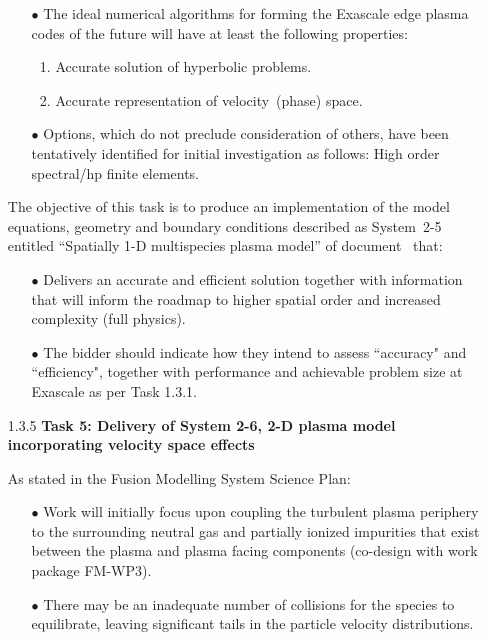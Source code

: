 \begin{itemize}
\begin{itemize}
\item[$\bullet$] The ideal numerical algorithms for forming the Exascale edge plasma codes 
of the future will have at least the following properties: 

\begin{enumerate}
\item Accurate solution of hyperbolic problems. 
\item Accurate representation of velocity~(phase) space. 
\end{enumerate}

\item[$\bullet$] Options, which do not preclude consideration of others, have been tentatively 
identified for initial investigation as follows: High order spectral/hp finite 
elements.
\end{itemize}

The objective of this task is to produce an implementation of the model equations, 
geometry and boundary conditions described as System~2-5 entitled ``Spatially 
1-D multispecies plasma model'' of document~\cite{pappeqs} that: 

\begin{itemize}
\item[$\bullet$] Delivers an accurate and efficient solution together with information that 
will inform the roadmap to higher spatial order and increased complexity (full physics).
\item[$\bullet$] The bidder should indicate how they intend to assess ``accuracy" and ``efficiency",
together with performance and achievable problem size at Exascale as per Task 1.3.1.
\end{itemize}

\item[1.3.5]\textbf{Task 5: Delivery of System 2-6, 2-D plasma model incorporating velocity
space effects}

As stated in the Fusion Modelling System Science Plan:

\begin{itemize}
\item[$\bullet$] Work will initially focus upon coupling the turbulent plasma periphery to 
the surrounding neutral gas and partially ionized impurities that exist between 
the plasma and plasma facing components (co-design with work package FM-WP3). 

\item[$\bullet$] There may be an inadequate number of collisions for the species to equilibrate, 
leaving significant tails in the particle velocity distributions. 


\end{itemize}
\end{itemize}

